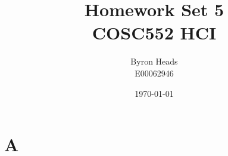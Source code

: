 \documentclass[12pt]{report}
\title{Homework Set 5 \\
    COSC552 HCI}
\author{ Byron Heads \\
    E00062946 }
\date{\today}
\begin{document}
\maketitle

\chapter*{A}
\end{document}
